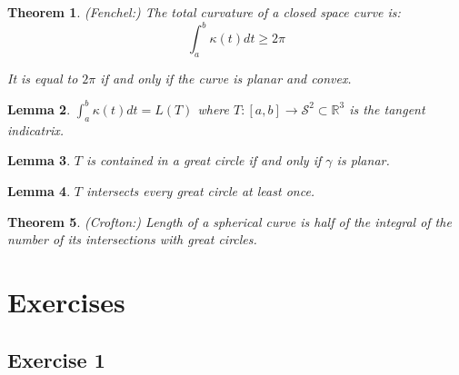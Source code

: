 \documentclass[a4paper,11pt,notitlepage,fullpage]{paper}
\theoremstyle{plain}
\newtheorem{thm}{Theorem}[section] %
\newtheorem{lem}[thm]{Lemma}
\theoremstyle{definition}
\begin{document}
\begin{thm}
(Fenchel:) The total curvature of a closed space curve is:
\begin{equation*}
\int_a^b \kappa(t) dt \geq 2\pi
\end{equation*}

It is equal to $2\pi$ if and only if the curve is planar and convex.

\end{thm}

\begin{lem}
$\int_a^b \kappa(t) dt = L(T)$
where $T:[a,b] \to \mathcal S^2 \subset \mathbb R^3$ is the \emph{tangent indicatrix}.
\end{lem}

\begin{lem}
$T$ is contained in a great circle if and only if $\gamma$ is planar.
\end{lem}

\begin{lem}
$T$ intersects every great circle at least once.
\end{lem}

\begin{thm}
(Crofton:) Length of a spherical curve is half of the integral of the number of its intersections with great circles.
\end{thm}





\section{Exercises}

\subsection{Exercise 1}
\end{document}
